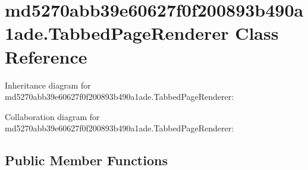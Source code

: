 \hypertarget{classmd5270abb39e60627f0f200893b490a1ade_1_1_tabbed_page_renderer}{}\section{md5270abb39e60627f0f200893b490a1ade.\+Tabbed\+Page\+Renderer Class Reference}
\label{classmd5270abb39e60627f0f200893b490a1ade_1_1_tabbed_page_renderer}


Inheritance diagram for md5270abb39e60627f0f200893b490a1ade.\+Tabbed\+Page\+Renderer\+:


Collaboration diagram for md5270abb39e60627f0f200893b490a1ade.\+Tabbed\+Page\+Renderer\+:
\subsection*{Public Member Functions}
